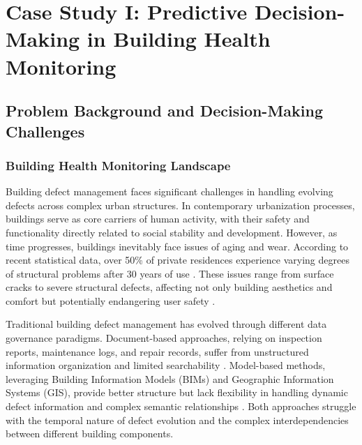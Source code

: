 
\chapter{Case Study I: Predictive Decision-Making in Building Health Monitoring} \label{chp:building}


\section{Problem Background and Decision-Making Challenges}

\subsection{Building Health Monitoring Landscape}

Building defect management faces significant challenges in handling evolving defects across complex urban structures. In contemporary urbanization processes, buildings serve as core carriers of human activity, with their safety and functionality directly related to social stability and development. However, as time progresses, buildings inevitably face issues of aging and wear. According to recent statistical data, over 50\% of private residences experience varying degrees of structural problems after 30 years of use \cite{spencer2019advances}. These issues range from surface cracks to severe structural defects, affecting not only building aesthetics and comfort but potentially endangering user safety \cite{zhang2023automated}.

Traditional building defect management has evolved through different data governance paradigms. Document-based approaches, relying on inspection reports, maintenance logs, and repair records, suffer from unstructured information organization and limited searchability \cite{bruno2018historic}. Model-based methods, leveraging Building Information Models (BIMs) and Geographic Information Systems (GIS), provide better structure but lack flexibility in handling dynamic defect information and complex semantic relationships \cite{li2024single,tsilimantou2020gis}. Both approaches struggle with the temporal nature of defect evolution and the complex interdependencies between different building components.

